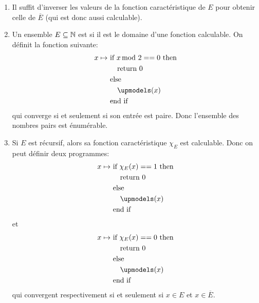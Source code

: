 {\begin{td-sol}[]
\begin{enumerate}
\begin{itemize}
\begin{align*}
								&\quad \text{return } 1 \\
								&\text{else } \\
								&\quad \text{return } 0\\
								&\text{end if}
				\end{align*}
			\end{itemize}
			\item Il suffit d'inverser les valeurs de la fonction caractéristique
			de \(E\) pour obtenir celle de \(\overline{E}\) (qui est donc aussi calculable).
			\item Un ensemble \(E\subseteq \mathbb{N}\) est  si
			il est le domaine d'une fonction calculable. On définit la fonction suivante:
			\begin{align*}
				x \mapsto\ & \text{if } x \hspace{-0.5em}\mod 2 == 0 \text{ then}\\
							&\quad \text{return } 0 \\
							&\text{else } \\
							&\quad \upmodels(x)\\
							&\text{end if}
			\end{align*}
			qui converge si et seulement si son entrée est paire.
			Donc l'ensemble des nombres pairs est énumérable.

			\item Si \(E\) est récursif, alors sa fonction caractéristique \(\chi_E\) est calculable.
			Donc on peut définir deux programmes:
			\begin{align*}
				x \mapsto\ & \text{if } \chi_E(x) == 1 \text{ then}\\
						&\quad \text{return } 0 \\
						&\text{else } \\
						&\quad \upmodels(x) \\
						&\text{end if}
			\end{align*}
			et
			\begin{align*}
				x \mapsto\ & \text{if } \chi_E(x) == 0 \text{ then}\\
						&\quad \text{return } 0 \\
						&\text{else } \\
						&\quad \upmodels(x) \\
						&\text{end if}
			\end{align*}
			qui convergent respectivement si et seulement si \(x \in E\) et \(x \in \overline{E}\).
		\end{enumerate}
	\end{td-sol}
}{}


